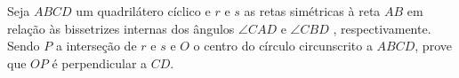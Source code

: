 Seja $ABCD$ um quadrilátero cíclico e $r$ e $s$ as retas simétricas à reta $AB$ em relação às bissetrizes internas dos ângulos $\angle CAD$ e $\angle CBD$ , respectivamente.
Sendo $P$ a interseção de $r$ e $s$ e $O$ o centro do círculo circunscrito a $ABCD$, prove que $OP$ é perpendicular a $CD$.